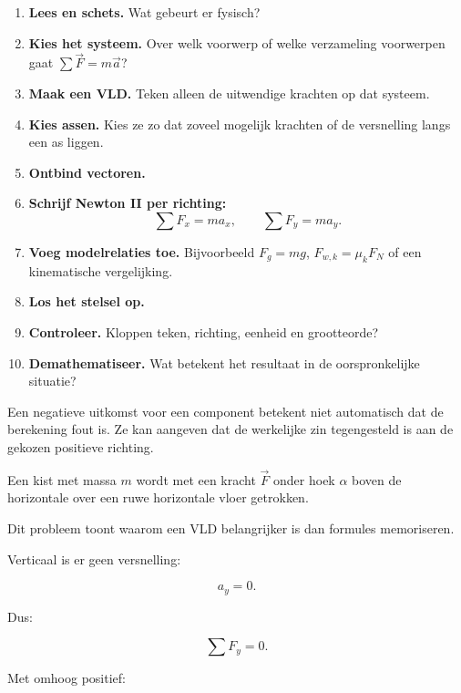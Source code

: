 \documentclass{ximera}
\begin{document}
\begin{enumerate}
  \item \textbf{Lees en schets.} Wat gebeurt er fysisch?
  \item \textbf{Kies het systeem.} Over welk voorwerp of welke verzameling
        voorwerpen gaat $\sum\vec F=m\vec a$?
  \item \textbf{Maak een VLD.} Teken alleen de uitwendige krachten op dat
        systeem.
  \item \textbf{Kies assen.} Kies ze zo dat zoveel mogelijk krachten of
        de versnelling langs een as liggen.
  \item \textbf{Ontbind vectoren.}
  \item \textbf{Schrijf Newton II per richting:}
        \[
        \sum F_x=ma_x,\qquad \sum F_y=ma_y.
        \]
  \item \textbf{Voeg modelrelaties toe.} Bijvoorbeeld
        $F_g=mg$, $F_{w,k}=\mu_kF_N$ of een kinematische vergelijking.
  \item \textbf{Los het stelsel op.}
  \item \textbf{Controleer.} Kloppen teken, richting, eenheid en
        grootteorde?
  \item \textbf{Demathematiseer.} Wat betekent het resultaat in de
        oorspronkelijke situatie?
\end{enumerate}

\begin{opmerking}
Een negatieve uitkomst voor een component betekent niet automatisch dat
de berekening fout is. Ze kan aangeven dat de werkelijke zin tegengesteld
is aan de gekozen positieve richting.
\end{opmerking}




Een kist met massa $m$ wordt met een kracht $\vec F$ onder hoek
$\alpha$ boven de horizontale over een ruwe horizontale vloer getrokken.

Dit probleem toont waarom een VLD belangrijker is dan formules
memoriseren.

Verticaal is er geen versnelling:

\[
a_y=0.
\]

Dus:

\[
\sum F_y=0.
\]

Met omhoog positief:
\end{document}
